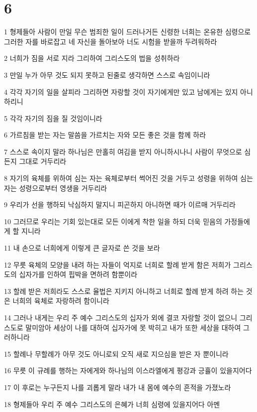 \chapter{6}

\par 1 형제들아 사람이 만일 무슨 범죄한 일이 드러나거든 신령한 너희는 온유한 심령으로 그러한 자를 바로잡고 네 자신을 돌아보아 너도 시험을 받을까 두려워하라
\par 2 너희가 짐을 서로 지라 그리하여 그리스도의 법을 성취하라
\par 3 만일 누가 아무 것도 되지 못하고 된줄로 생각하면 스스로 속임이니라
\par 4 각각 자기의 일을 살피라 그리하면 자랑할 것이 자기에게만 있고 남에게는 있지 아니하리니
\par 5 각각 자기의 짐을 질 것임이니라
\par 6 가르침을 받는 자는 말씀을 가르치는 자와 모든 좋은 것을 함께 하라
\par 7 스스로 속이지 말라 하나님은 만홀히 여김을 받지 아니하시나니 사람이 무엇으로 심든지 그대로 거두리라
\par 8 자기의 육체를 위하여 심는 자는 육체로부터 썩어진 것을 거두고 성령을 위하여 심는 자는 성령으로부터 영생을 거두리라
\par 9 우리가 선을 행하되 낙심하지 말지니 피곤하지 아니하면 때가 이르매 거두리라
\par 10 그러므로 우리는 기회 있는대로 모든 이에게 착한 일을 하되 더욱 믿음의 가정들에게 할 지니라
\par 11 내 손으로 너희에게 이렇게 큰 글자로 쓴 것을 보라
\par 12 무릇 육체의 모양을 내려 하는 자들이 억지로 너희로 할례 받게 함은 저희가 그리스도의 십자가를 인하여 핍박을 면하려 함뿐이라
\par 13 할례 받은 저희라도 스스로 율법은 지키지 아니하고 너희로 할례 받게 하려 하는 것은 너희의 육체로 자랑하려 함이니라
\par 14 그러나 내게는 우리 주 예수 그리스도의 십자가 외에 결코 자랑할 것이 없으니 그리스도로 말미암아 세상이 나를 대하여 십자가에 못 박히고 내가 또한 세상을 대하여 그러하니라
\par 15 할례나 무할례가 아무 것도 아니로되 오직 새로 지으심을 받은 자 뿐이니라
\par 16 무릇 이 규례를 행하는 자에게와 하나님의 이스라엘에게 평강과 긍휼이 있을지어다
\par 17 이 후로는 누구든지 나를 괴롭게 말라 내가 내 몸에 예수의 흔적을 가졌노라
\par 18 형제들아 우리 주 예수 그리스도의 은혜가 너희 심령에 있을지어다 아멘


